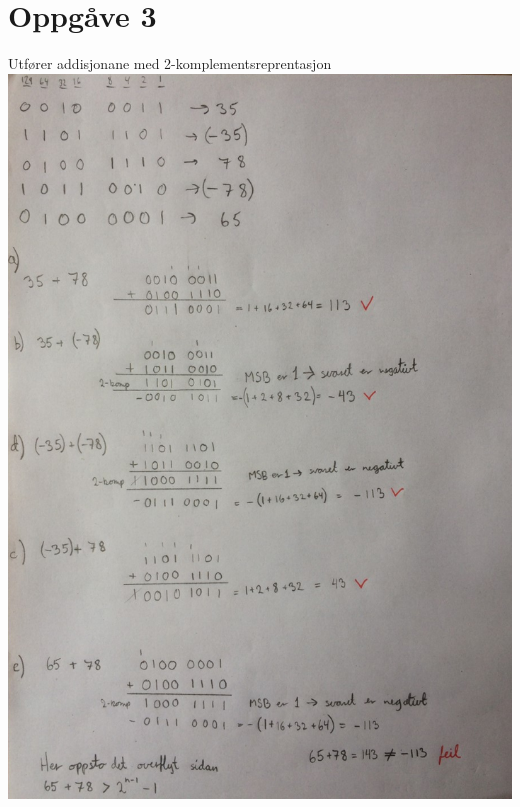 \documentclass[12pt,a4paper]{article}
\begin{document}
		
	\section{Oppgåve 3}
		Utfører addisjonane med 2-komplementsreprentasjon \\
		\includegraphics[width=\textwidth]{01_3.png}
	
\end{document}
